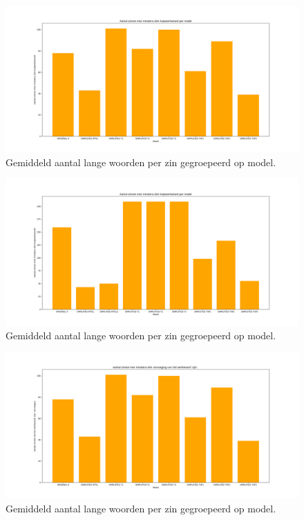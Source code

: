 
\begin{figure}
	\includegraphics[width=\linewidth]{img/boxplot-aux-a1.png}
	\caption{Gemiddeld aantal lange woorden per zin gegroepeerd op model.}
	\label{img:histplot-aux-a1}
\end{figure}

\begin{figure}
	\includegraphics[width=\linewidth]{img/boxplot-aux-a2.png}
	\caption{Gemiddeld aantal lange woorden per zin gegroepeerd op model.}
	\label{img:histplot-aux-a2}
\end{figure}


\begin{figure}
	\includegraphics[width=\linewidth]{img/boxplot-tobe-a1.png}
	\caption{Gemiddeld aantal lange woorden per zin gegroepeerd op model.}
	\label{img:histplot-tobe-a1}
\end{figure}

